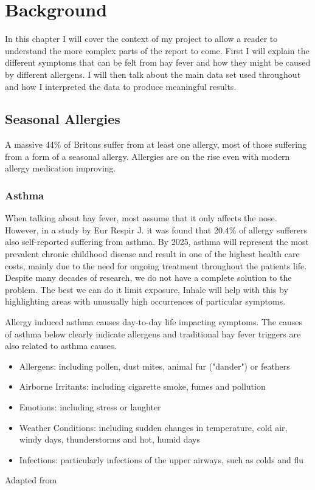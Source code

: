\chapter{Background}
\label{cha:back}

In this chapter I will cover the context of my project to allow a reader to understand the more complex parts of the report to come. First I will explain the different symptoms that can be felt from hay fever and how they might be caused by different allergens. I will then talk about the main data set used throughout and how I interpreted the data to produce meaningful results.

\section{Seasonal Allergies}
A massive 44\% of Britons suffer from at least one allergy, most of those suffering from a form of a seasonal allergy. Allergies are on the rise even with modern allergy medication improving.
\cite{mintelallergy}

\subsection{Asthma}
When talking about hay fever, most assume that it only affects the nose. However, in a study by Eur Respir J. it was found that 20.4\% of allergy sufferers also self-reported suffering from asthma\cite{rhinitis}. By 2025, asthma will represent the most prevalent chronic childhood disease and result in one of the highest health care costs, mainly due to the need for ongoing treatment throughout the patients life\cite{childhood}. Despite many decades of research, we do not have a complete solution to the problem. The best we can do it limit exposure, Inhale will help with this by highlighting areas with unusually high occurrences of particular symptoms.

Allergy induced asthma causes day-to-day life impacting symptoms. The causes of asthma below clearly indicate allergens and traditional hay fever triggers are also related to asthma causes.\\


\begin{itemize}
  \item Allergens: including pollen, dust mites, animal fur ("dander") or feathers
  \item Airborne Irritants: including cigarette smoke, fumes and pollution
  \item Emotions: including stress or laughter
  \item Weather Conditions: including sudden changes in temperature, cold air, windy days, thunderstorms and hot, humid days
  \item Infections: particularly infections of the upper airways, such as colds and flu
\end{itemize}Adapted from \cite{urlasthmacauses}\\

